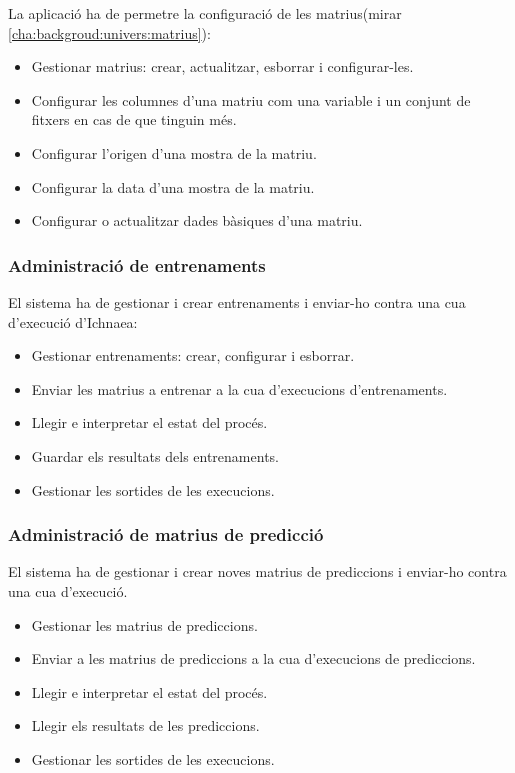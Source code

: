 La aplicaci\'{o} ha de permetre la configuraci\'{o} de les matrius(mirar \ref{cha:backgroud:univers:matrius}):
\begin{itemize}
\item Gestionar matrius: crear, actualitzar, esborrar i configurar-les.
\item Configurar les columnes d'una matriu com una variable i un conjunt de fitxers en cas de que tinguin m\'{e}s.
\item Configurar l'origen d'una mostra de la matriu.
\item Configurar la data d'una mostra de la matriu.
\item Configurar o actualitzar dades b\`{a}siques d'una matriu.
\end{itemize}

\subsubsection{Administraci\'{o} de entrenaments}
El sistema ha de gestionar i crear entrenaments i enviar-ho contra una cua d'execuci\'{o} d'Ichnaea:
\begin{itemize}
	\item Gestionar entrenaments: crear, configurar i esborrar.
	\item Enviar les matrius a entrenar a la cua d'execucions d'entrenaments.
	\item Llegir e interpretar el estat del proc\'{e}s.
	\item Guardar els resultats dels entrenaments.
	\item Gestionar les sortides de les execucions.
\end{itemize}

\subsubsection{Administraci\'{o} de matrius de predicci\'{o}}
El sistema ha de gestionar i crear noves matrius de prediccions i enviar-ho contra una cua d'execuci\'{o}.
\begin{itemize}
	\item Gestionar les matrius de prediccions.
	\item Enviar a les matrius de prediccions a la cua d'execucions de prediccions.
	\item Llegir e interpretar el estat del proc\'{e}s.
	\item Llegir els resultats de les prediccions.
	\item Gestionar les sortides de les execucions.
\end{itemize}

